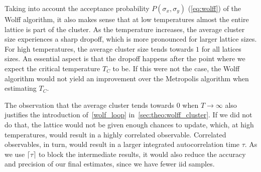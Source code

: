 		Taking into account the acceptance probability $P(\sigma_x, \sigma_y)$ (\cref{eq:wolff}) of the Wolff algorithm, it also makes sense that at low temperatures almost the entire lattice is part of the cluster. As the temperature increases, the average cluster size experiences a sharp dropoff, which is more pronounced for larger lattice sizes. For high temperatures, the average cluster size tends towards $\num{1}$ for all latices sizes. An essential aspect is that the dropoff happens after the point where we expect the critical temperature $T_C$ to be. If this were not the case, the Wolff algorithm would not yield an improvement over the Metropolis algorithm when estimating $T_C$.
		
		The observation that the average cluster tends towards $\num{0}$ when $T\rightarrow \infty$ also justifies the introduction of~\cref{wolf_loop} in~\cref{sec:theo:wolff_cluster}. If we did not do that, the lattice would not be given enough chances to update, which, at high temperatures, would result in a highly correlated observable. Correlated observables, in turn, would result in a larger integrated autocorrelation time $\tau$. As we use $\lceil \tau \rceil$ to block the intermediate results, it would also reduce the accuracy and precision of our final estimates, since we have fewer iid samples.
	